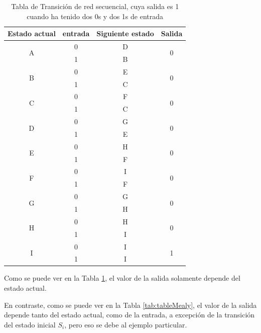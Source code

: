 \documentclass[journal,trans]{IEEEtran}
\begin{document}
	\begin{table}[h]
		\centering
		\bgroup
		\def\arraystretch{1.5}
		\begin{tabular}{|c|c|c|c|}
			\hline
			Estado actual & entrada & Siguiente estado & Salida \\
			\hline
			\multirow{2}{*}{A} & 0 & D & \multirow{2}{*}{0} \\
			\cline{2-3}
			& 1 & B & \\
			\hline
			\multirow{2}{*}{B} & 0 & E & \multirow{2}{*}{0} \\
			\cline{2-3}
			& 1 & C & \\
			\hline
			\multirow{2}{*}{C} & 0 & F & \multirow{2}{*}{0} \\
			\cline{2-3}
			& 1 & C & \\
			\hline
			\multirow{2}{*}{D} & 0 & G & \multirow{2}{*}{0} \\
			\cline{2-3}
			& 1 & E & \\
			\hline
			\multirow{2}{*}{E} & 0 & H & \multirow{2}{*}{0} \\
			\cline{2-3}
			& 1 & F & \\
			\hline
			\multirow{2}{*}{F} & 0 & I & \multirow{2}{*}{0} \\
			\cline{2-3}
			& 1 & F & \\
			\hline
			\multirow{2}{*}{G} & 0 & G & \multirow{2}{*}{0} \\
			\cline{2-3}
			& 1 & H & \\
			\hline
			\multirow{2}{*}{H} & 0 & H & \multirow{2}{*}{0} \\
			\cline{2-3}
			& 1 & I & \\
			\hline
			\multirow{2}{*}{I} & 0 & I & \multirow{2}{*}{1} \\
			\cline{2-3}
			& 1 & I & \\
			\hline
		\end{tabular}
		\egroup
		\caption{Tabla de Transición de red secuencial, cuya salida es 1 cuando ha tenido dos 0s y dos 1s de entrada}
		\label{tab:MooreTable}
	\end{table}
	
	Como se puede ver en la Tabla \ref{tab:MooreTable}, el valor de la salida solamente depende del estado actual.
	
	En contraste, como se puede ver en la Tabla \ref{tab:tableMealy}, el valor de la salida depende tanto del estado actual, como de la entrada, a excepción de la transición del estado inicial $S_{i}$, pero eso se debe al ejemplo particular.
	
\end{document}
